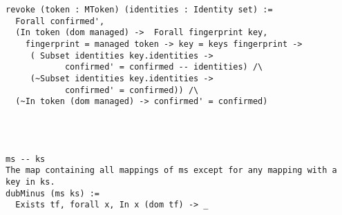 \documentclass{article}
\begin{document}
\begin{verbatim}
revoke (token : MToken) (identities : Identity set) :=
  Forall confirmed', 
  (In token (dom managed) ->  Forall fingerprint key,  
    fingerprint = managed token -> key = keys fingerprint -> 
     ( Subset identities key.identities ->  
            confirmed' = confirmed -- identities) /\
     (~Subset identities key.identities -> 
            confirmed' = confirmed)) /\
  (~In token (dom managed) -> confirmed' = confirmed)




ms -- ks 	
The map containing all mappings of ms except for any mapping with a key in ks.
dubMinus (ms ks) := 
  Exists tf, forall x, In x (dom tf) -> _ 
  

    

\end{verbatim}
\end{document}
